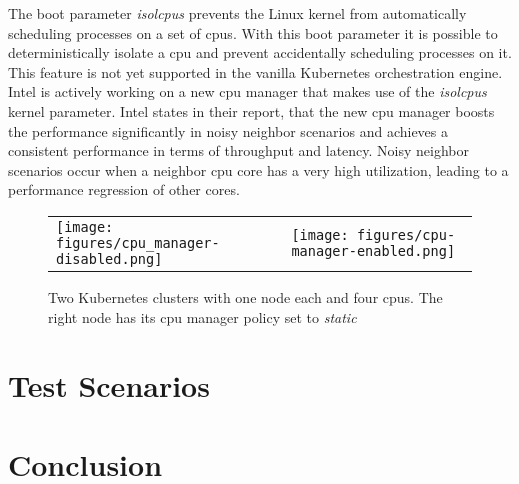 \documentclass[titlepage]{report}
\begin{document}
The boot parameter \emph{isolcpus} prevents the Linux kernel from automatically scheduling processes on a set of \glspl{cpu}. With this boot parameter it is possible to deterministically isolate a \gls{cpu}
and prevent accidentally scheduling processes on it. This feature is not yet supported in the vanilla Kubernetes orchestration engine. Intel is actively working on a new \gls{cpu} manager that makes use of the
\emph{isolcpus} kernel parameter. Intel states in their report, that the new \gls{cpu} manager boosts the performance significantly in noisy neighbor scenarios and achieves a consistent performance
in terms of throughput and latency\cite{IntelCPUPinning}. Noisy neighbor scenarios occur when a neighbor \gls{cpu} core has a very high utilization, leading to a performance regression of other cores.   

\begin{figure}[H]
  \centering
\begin{tabular}{ll}
\texttt{[image: figures/cpu\_manager-disabled.png]}
&
\texttt{[image: figures/cpu-manager-enabled.png]}
\end{tabular}
\caption{Two Kubernetes clusters with one node each and four \glspl{cpu}. The right node has its \gls{cpu} manager policy set to \emph{static}}\label{fig:cpu-manager}
\end{figure}


\chapter{Test Scenarios}
\chapter{Conclusion}

\nocite{*}
\lstlistoflistings{}
\listoffigures
\printbibliography{}
\printglossary{}
\end{document}
